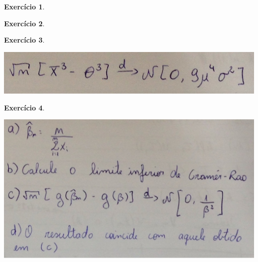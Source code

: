 \documentclass[letter,11pt]{article}
\newtheorem{exer}{Exercício}
\begin{document}
\begin{exer} \rm
\end{exer}


\begin{exer} \rm
\end{exer}

\begin{exer} \rm
\end{exer}
\includegraphics[scale=0.3]{gabarito_ex13_lista7.jpg}



\begin{exer} \rm
\end{exer}
\includegraphics[scale=0.4]{gabarito_ex14_lista7.jpg}
\end{document}
